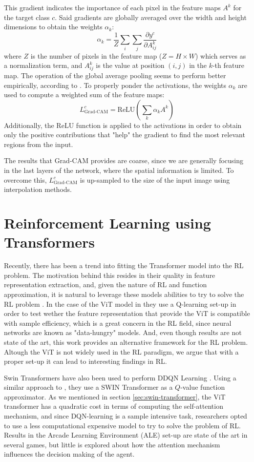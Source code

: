 This gradient indicates the importance of each pixel in the feature maps $A^k$ for the target class $c$. Said gradients are globally averaged over the width and height dimensions to obtain the weights $\alpha_k$:
\[
\alpha_k = \frac{1}{Z} \sum_i \sum_j \frac{\partial y^c}{\partial A_{ij}^k}
\]
where $Z$ is the number of pixels in the feature map ($Z = H \times W$) which serves as a normalization term, and $A_{ij}^k$ is the value at position $(i, j)$ in the $k$-th feature map. The operation of the global average pooling seems to perform better empirically, according to \cite{Selvaraju_2019}. To properly ponder the activations, the weights $\alpha_k$ are used to compute a weighted sum of the feature maps:
\[
L_{\text{Grad-CAM}}^c = \text{ReLU} \left( \sum_k \alpha_k A^k \right)
\]
Additionally, the ReLU function is applied to the activations in order to obtain only the positive contributions that "help" the gradient to find the most relevant regions from the input. 

The results that Grad-CAM provides are coarse, since we are generally focusing in the last layers of the network, where the spatial information is limited. To overcome this, $L_{\text{Grad-CAM}}^c$ is up-sampled to the size of the input image using interpolation methods.


\section{Reinforcement Learning using Transformers}
\label{sec:rl-with-attention}

Recently, there has been a trend into fitting the Transformer model into the RL problem. The motivation behind this resides in their quality in feature representation extraction, and, given the nature of RL and function approximation, it is natural to leverage these models abilities to try to solve the RL problem \cite{rl_transformers2023survey}. In the case of the ViT model in \cite{vit_q_learning_sample_eff} they use a Q-learning set-up in order to test wether the feature representation that provide the ViT is compatible with sample efficiency, which is a great concern in the RL field, since neural networks are known as "data-hungry" models. And, even though results are not state of the art, this work provides an alternative framework for the RL problem. Altough the ViT is not widely used in the RL paradigm, we argue that with a proper set-up it can lead to interesting findings in RL.

Swin Transformers have also been used to perform DDQN Learning \cite{meng2024deep}. Using a similar approach to \cite{vanhasselt2015deep}, they use a SWIN Transformer as a $Q$-value function approximator. As we mentioned in section \ref{sec:swin-transformer}, the ViT transformer has a quadratic cost in terms of computing the self-attention mechanism, and since DQN-learning is a sample intensive task, researchers opted to use a less computational expensive model to try to solve the problem of RL. Results in the Arcade Learning Environment (ALE) \cite{Bellemare_2013} set-up are state of the art in several games, but little is explored about how the attention mechanism influences the decision making of the agent.

